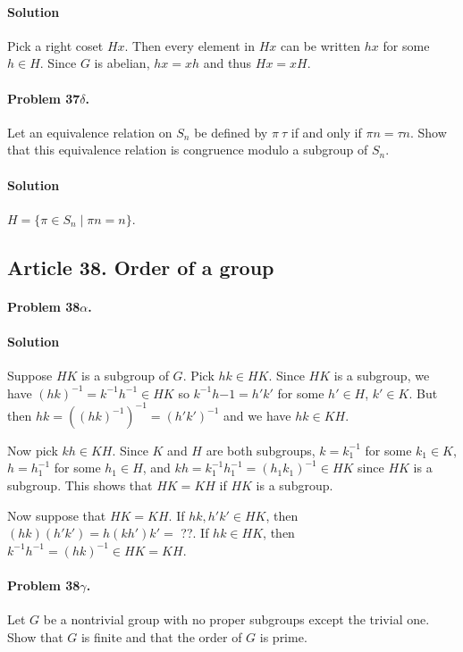 \paragraph*{Solution}
Pick a right coset $Hx$. Then every element in $Hx$ can be written $hx$ for
some $h \in H$. Since $G$ is abelian, $hx = xh$ and thus $Hx = xH$.

\paragraph{Problem 37$\delta$.}
Let an equivalence relation on $S_n$ be defined by $\pi ~ \tau$ if and only if
$\pi n = \tau n$. Show that this equivalence relation is congruence modulo a
subgroup of $S_n$.

\paragraph*{Solution}
$H = \{ \pi \in S_n \mid \pi n = n \}$.

\subsection{Article 38. Order of a group}

\paragraph{Problem 38$\alpha$.}

\paragraph*{Solution}
Suppose $HK$ is a subgroup of $G$. Pick $hk \in HK$. Since $HK$ is a subgroup,
we have $(hk)^{-1} = k^{-1}h^{-1} \in HK$ so $k^{-1}h{-1} = h'k'$ for some
$h' \in H$, $k' \in K$. But then $hk = ((hk)^{-1})^{-1} = (h'k')^{-1}$ and
we have $hk \in KH$.

Now pick $kh \in KH$. Since $K$ and $H$ are both subgroups, $k = k_1^{-1}$ for
some $k_1 \in K$, $h = h_1^{-1} $ for some $h_1 \in H$, and
$kh = k_1^{-1}h_1^{-1} = (h_1 k_1)^{-1} \in HK$ since $HK$ is a subgroup. This
shows that $HK = KH$ if $HK$ is a subgroup.

Now suppose that $HK = KH$. If $hk, h'k' \in HK$, then $(hk)(h'k') = h(kh')k'
= $ ??.
If $hk \in HK$, then $k^{-1}h^{-1} = (hk)^{-1} \in
HK = KH$.

\paragraph{Problem 38$\gamma$.}
Let $G$ be a nontrivial group with no proper subgroups except the trivial one.
Show that $G$ is finite and that the order of $G$ is prime.

